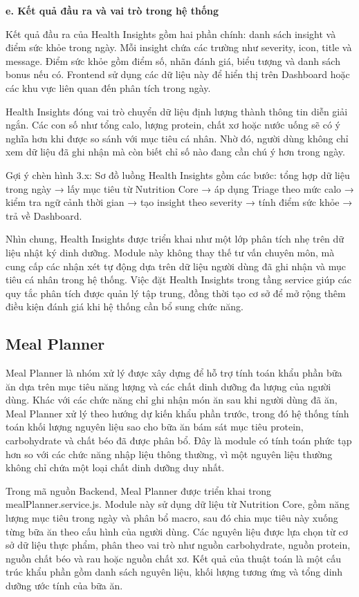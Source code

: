 \documentclass[12pt, a4paper]{report}
\begin{document}
\textbf{e. Kết quả đầu ra và vai trò trong hệ thống}

Kết quả đầu ra của Health Insights gồm hai phần chính: danh sách insight và điểm sức khỏe trong ngày. Mỗi insight chứa các trường như severity, icon, title và message. Điểm sức khỏe gồm điểm số, nhãn đánh giá, biểu tượng và danh sách bonus nếu có. Frontend sử dụng các dữ liệu này để hiển thị trên Dashboard hoặc các khu vực liên quan đến phân tích trong ngày.

Health Insights đóng vai trò chuyển dữ liệu định lượng thành thông tin diễn giải ngắn. Các con số như tổng calo, lượng protein, chất xơ hoặc nước uống sẽ có ý nghĩa hơn khi được so sánh với mục tiêu cá nhân. Nhờ đó, người dùng không chỉ xem dữ liệu đã ghi nhận mà còn biết chỉ số nào đang cần chú ý hơn trong ngày.

Gợi ý chèn hình 3.x: Sơ đồ luồng Health Insights gồm các bước: tổng hợp dữ liệu trong ngày → lấy mục tiêu từ Nutrition Core → áp dụng Triage theo mức calo → kiểm tra ngữ cảnh thời gian → tạo insight theo severity → tính điểm sức khỏe → trả về Dashboard.

Nhìn chung, Health Insights được triển khai như một lớp phân tích nhẹ trên dữ liệu nhật ký dinh dưỡng. Module này không thay thế tư vấn chuyên môn, mà cung cấp các nhận xét tự động dựa trên dữ liệu người dùng đã ghi nhận và mục tiêu cá nhân trong hệ thống. Việc đặt Health Insights trong tầng service giúp các quy tắc phân tích được quản lý tập trung, đồng thời tạo cơ sở để mở rộng thêm điều kiện đánh giá khi hệ thống cần bổ sung chức năng.

\subsection{Meal Planner}Meal Planner là nhóm xử lý được xây dựng để hỗ trợ tính toán khẩu phần bữa ăn dựa trên mục tiêu năng lượng và các chất dinh dưỡng đa lượng của người dùng. Khác với các chức năng chỉ ghi nhận món ăn sau khi người dùng đã ăn, Meal Planner xử lý theo hướng dự kiến khẩu phần trước, trong đó hệ thống tính toán khối lượng nguyên liệu sao cho bữa ăn bám sát mục tiêu protein, carbohydrate và chất béo đã được phân bổ. Đây là module có tính toán phức tạp hơn so với các chức năng nhập liệu thông thường, vì một nguyên liệu thường không chỉ chứa một loại chất dinh dưỡng duy nhất.

Trong mã nguồn Backend, Meal Planner được triển khai trong mealPlanner.service.js. Module này sử dụng dữ liệu từ Nutrition Core, gồm năng lượng mục tiêu trong ngày và phân bổ macro, sau đó chia mục tiêu này xuống từng bữa ăn theo cấu hình của người dùng. Các nguyên liệu được lựa chọn từ cơ sở dữ liệu thực phẩm, phân theo vai trò như nguồn carbohydrate, nguồn protein, nguồn chất béo và rau hoặc nguồn chất xơ. Kết quả của thuật toán là một cấu trúc khẩu phần gồm danh sách nguyên liệu, khối lượng tương ứng và tổng dinh dưỡng ước tính của bữa ăn.
\end{document}
